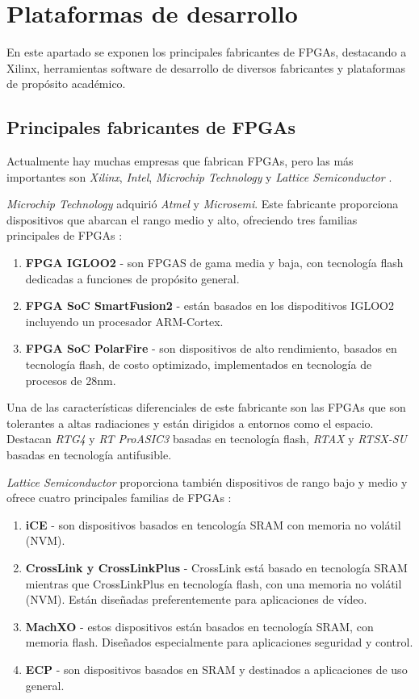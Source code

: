 \section{Plataformas de desarrollo} 

En este apartado se exponen los principales fabricantes de FPGAs, destacando a Xilinx, herramientas software de desarrollo  de diversos fabricantes y 
plataformas de propósito académico.

\subsection{Principales fabricantes de FPGAs}

Actualmente hay muchas empresas que fabrican FPGAs, pero las más importantes son \textit{Xilinx}, \textit{Intel}, \textit{Microchip Technology} y
\textit{Lattice Semiconductor} \cite{mercado}. 

\textit{Microchip Technology} adquirió \textit{Atmel} y \textit{Microsemi}. Este fabricante proporciona dispositivos que abarcan el rango medio 
y alto, ofreciendo tres familias principales de FPGAs \cite{microchip}:

\begin{enumerate}
    \item \textbf{FPGA IGLOO2} - son FPGAS de gama media y baja, con tecnología flash dedicadas a funciones de propósito general.
    \item \textbf{FPGA SoC SmartFusion2} - están basados en los dispoditivos IGLOO2 incluyendo un procesador ARM-Cortex.
    \item \textbf{FPGA SoC PolarFire} - son dispositivos de alto rendimiento, basados en tecnología flash, de costo optimizado, implementados en tecnología de procesos de 28nm.
\end{enumerate}

Una de las características diferenciales de este fabricante son las FPGAs que son tolerantes a altas radiaciones y están dirigidos a entornos como el espacio. Destacan \textit{RTG4} y 
\textit{RT ProASIC3} basadas en tecnología flash, \textit{RTAX} y \textit{RTSX-SU} basadas en tecnología antifusible.

\textit{Lattice Semiconductor} proporciona también dispositivos de rango bajo y medio y ofrece cuatro principales familias de FPGAs \cite{lattice}:

\begin{enumerate}
    \item \textbf{iCE} - son dispositivos basados en tencología SRAM con memoria no volátil (NVM). 
    \item \textbf{CrossLink y CrossLinkPlus} - CrossLink está basado en tecnología SRAM mientras que CrossLinkPlus en tecnología flash, con una memoria no volátil (NVM). 
    Están diseñadas preferentemente para aplicaciones de vídeo.
    \item \textbf{MachXO} - estos dispositivos están basados en tecnología SRAM, con memoria flash. Diseñados especialmente para aplicaciones seguridad y control.
    \item \textbf{ECP} - son dispositivos basados en SRAM y destinados a aplicaciones de uso general.
\end{enumerate}

